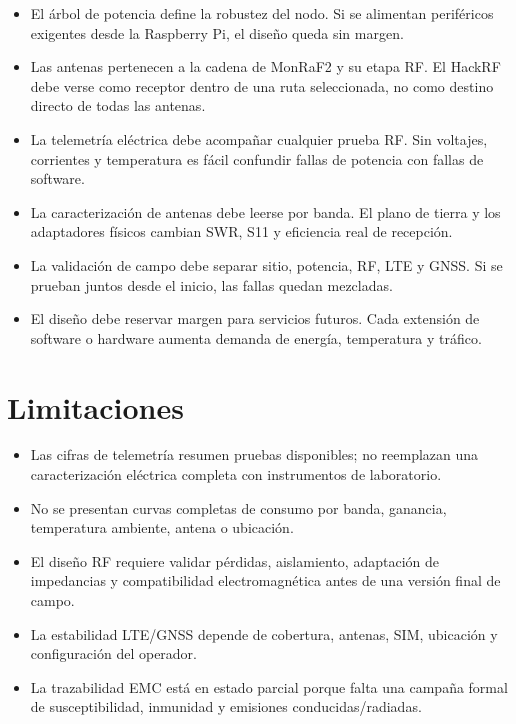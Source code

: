 \begin{itemize}[leftmargin=*]
    \item El árbol de potencia define la robustez del nodo. Si se alimentan
    periféricos exigentes desde la Raspberry Pi, el diseño queda sin margen.
    \item Las antenas pertenecen a la cadena de MonRaF2 y su etapa RF. El HackRF
    debe verse como receptor dentro de una ruta seleccionada, no como destino
    directo de todas las antenas.
    \item La telemetría eléctrica debe acompañar cualquier prueba RF. Sin
    voltajes, corrientes y temperatura es fácil confundir fallas de potencia con
    fallas de software.
    \item La caracterización de antenas debe leerse por banda. El plano de tierra
    y los adaptadores físicos cambian SWR, S11 y eficiencia real de recepción.
    \item La validación de campo debe separar sitio, potencia, RF, LTE y GNSS. Si
    se prueban juntos desde el inicio, las fallas quedan mezcladas.
    \item El diseño debe reservar margen para servicios futuros. Cada extensión
    de software o hardware aumenta demanda de energía, temperatura y tráfico.
\end{itemize}

\section{Limitaciones}

\begin{itemize}[leftmargin=*]
    \item Las cifras de telemetría resumen pruebas disponibles; no reemplazan una
    caracterización eléctrica completa con instrumentos de laboratorio.
    \item No se presentan curvas completas de consumo por banda, ganancia,
    temperatura ambiente, antena o ubicación.
    \item El diseño RF requiere validar pérdidas, aislamiento, adaptación de
    impedancias y compatibilidad electromagnética antes de una versión final de
    campo.
    \item La estabilidad LTE/GNSS depende de cobertura, antenas, SIM, ubicación y
    configuración del operador.
    \item La trazabilidad EMC está en estado parcial porque falta una campaña
    formal de susceptibilidad, inmunidad y emisiones conducidas/radiadas.
\end{itemize}

